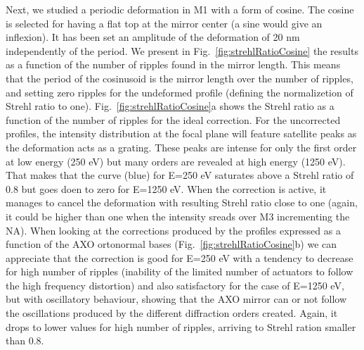 \documentclass{iucr}              %
\begin{document}
Next, we studied a periodic deformation in M1 with a form of cosine. The cosine is selected for having a flat top at the mirror center (a sine would give an inflexion). It has been set an amplitude of the deformation of 20 nm independently of the period. We present in Fig.~\ref{fig:strehlRatioCosine} the results as a function of the number of ripples found in the mirror length. This means that the period of the cosinusoid is the mirror length over the number of ripples, and setting zero ripples for the undeformed profile (defining the normalizetion of Strehl ratio to one). Fig.~\ref{fig:strehlRatioCosine}a shows the Strehl ratio as a function of the number of ripples for the ideal correction. For the uncorrected profiles, the intensity distribution at the focal plane will feature satellite peaks as the deformation acts as a grating. These peaks are intense for only the first order at low energy (250 eV) but many orders are revealed at high energy (1250 eV). That makes that the curve (blue) for E=250 eV saturates above a Strehl ratio of 0.8 but goes doen to zero for E=1250 eV. When the correction is active, it manages to cancel the deformation with resulting Strehl ratio close to one (again, it could be higher than one when the intensity sreads over M3 incrementing the NA). When looking at the corrections produced by the profiles expressed as a function of the AXO ortonormal bases (Fig.~\ref{fig:strehlRatioCosine}b) we can appreciate that the correction is good for E=250 eV with a tendency to decrease for high number of ripples (inability of the limited number of actuators to follow the high frequency distortion) and also satisfactory for the case of E=1250 eV, but with oscillatory behaviour, showing that the AXO mirror can or not follow the oscillations produced by the different diffraction orders created. Again, it drops to lower values for high number of ripples, arriving to Strehl ration smaller than 0.8. 
\end{document}
